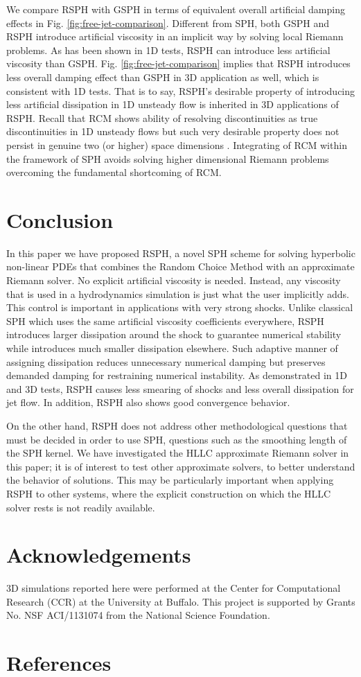 \documentclass[review]{elsarticle}
\begin{document}
We compare RSPH with GSPH in terms of equivalent overall artificial damping effects in Fig. \ref{fig:free-jet-comparison}. Different from SPH, both GSPH and RSPH introduce artificial viscosity in an implicit way by solving local Riemann problems. As has been shown in 1D tests, RSPH can introduce less artificial viscosity than GSPH. Fig. \ref{fig:free-jet-comparison} implies that RSPH introduces less overall damping effect than GSPH in 3D application as well, which is consistent with 1D tests. That is to say, RSPH's desirable property of introducing less artificial dissipation in 1D unsteady flow is inherited in 3D applications of RSPH. Recall that RCM shows ability of resolving discontinuities as true discontinuities in 1D unsteady flows but such very desirable property does not persist in genuine two (or higher) space dimensions \citep{colella1982glimm}. Integrating of RCM within the framework of SPH avoids solving higher dimensional Riemann problems overcoming the fundamental shortcoming of RCM.

\section{Conclusion} \label{discussion}
In this paper we have proposed RSPH, a novel SPH scheme for solving hyperbolic non-linear PDEs that combines the Random Choice Method with an approximate Riemann solver. No explicit artificial viscosity is needed. Instead, any viscosity that is used in a hydrodynamics simulation is just what the user implicitly adds. 
This control is important in applications with very strong shocks. 
Unlike classical SPH which uses the same artificial viscosity coefficients everywhere, RSPH introduces larger dissipation around the shock to guarantee numerical stability while introduces much smaller dissipation elsewhere. Such adaptive manner of assigning dissipation reduces unnecessary numerical damping but preserves demanded damping for restraining numerical instability. As demonstrated in 1D and 3D tests, RSPH causes less smearing of shocks and less overall dissipation for jet flow.
In addition, RSPH also shows good convergence behavior.

On the other hand, RSPH does not address other methodological questions that must be decided in order to use SPH, questions such as the smoothing length of the SPH kernel. We have investigated the HLLC approximate Riemann solver in this paper; it is of interest to test other approximate solvers, to better understand the behavior of solutions. This may be particularly important when applying RSPH to other systems, where the explicit construction on which the HLLC solver rests is not readily available.

\section*{Acknowledgements}
3D simulations reported here were performed at the Center for Computational Research (CCR) at the University at Buffalo. This project is supported by Grants No. NSF ACI/1131074 from the National Science Foundation.

\section*{References}


\end{document}
